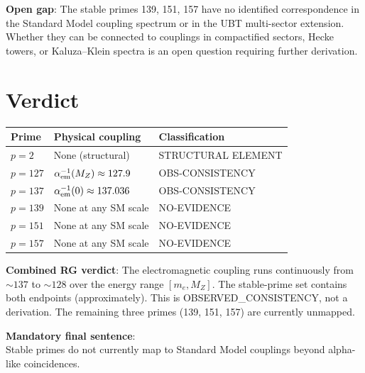 \documentclass[12pt,a4paper]{article}
\theoremstyle{definition}
\theoremstyle{remark}
\begin{document}
\begin{gapbox}
\textbf{Open gap}: The stable primes 139, 151, 157 have no identified
correspondence in the Standard Model coupling spectrum or in the UBT
multi-sector extension.  Whether they can be connected to couplings in
compactified sectors, Hecke towers, or Kaluza--Klein spectra is an open
question requiring further derivation.
\end{gapbox}

\section{Verdict}

\begin{center}
\begin{tabular}{lll}
\toprule
Prime & Physical coupling & Classification \\
\midrule
$p = 2$ & None (structural) & STRUCTURAL ELEMENT \\
$p = 127$ & $\alpha_{\rm em}^{-1}(M_Z) \approx 127.9$ & OBS-CONSISTENCY \\
$p = 137$ & $\alpha_{\rm em}^{-1}(0) \approx 137.036$ & OBS-CONSISTENCY \\
$p = 139$ & None at any SM scale & NO-EVIDENCE \\
$p = 151$ & None at any SM scale & NO-EVIDENCE \\
$p = 157$ & None at any SM scale & NO-EVIDENCE \\
\bottomrule
\end{tabular}
\end{center}

\textbf{Combined RG verdict}:
The electromagnetic coupling runs continuously from $\sim 137$ to $\sim 128$
over the energy range $[m_e, M_Z]$.  The stable-prime set contains both
endpoints (approximately).  This is OBSERVED\_CONSISTENCY, not a derivation.
The remaining three primes (139, 151, 157) are currently unmapped.

\begin{resultbox}
\textbf{Mandatory final sentence}:\\
Stable primes do not currently map to Standard Model couplings beyond
alpha-like coincidences.
\end{resultbox}
\end{document}
